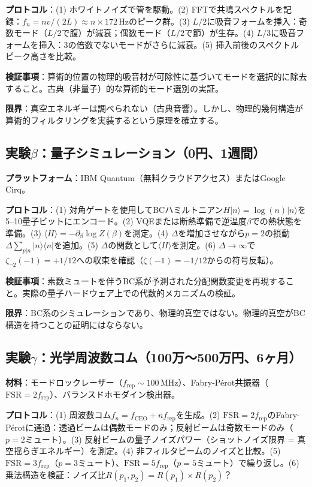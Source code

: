 \documentclass[11pt,a4paper]{article}
\begin{document}
\textbf{プロトコル}：(1) ホワイトノイズで管を駆動。(2) FFTで共鳴スペクトルを記録：$f_n = nv/(2L) \approx n \times 172$\,Hzのピーク群。(3) $L/2$に吸音フォームを挿入：奇数モード（$L/2$で腹）が減衰；偶数モード（$L/2$で節）が生存。(4) $L/3$に吸音フォームを挿入：3の倍数でないモードがさらに減衰。(5) 挿入前後のスペクトルピーク高さを比較。

\textbf{検証事項}：算術的位置の物理的吸音材が可除性に基づいてモードを選択的に除去すること。古典（非量子）的な算術的モード選別の実証。

\textbf{限界}：真空エネルギーは調べられない（古典音響）。しかし、物理的幾何構造が算術的フィルタリングを実装するという原理を確立する。

\subsection{実験$\beta$：量子シミュレーション（0円、1週間）}

\textbf{プラットフォーム}：IBM Quantum（無料クラウドアクセス）またはGoogle Cirq。

\textbf{プロトコル}：(1) 対角ゲートを使用してBCハミルトニアン$H|n\rangle = \log(n)|n\rangle$を5--10量子ビットにエンコード。(2) VQEまたは断熱準備で逆温度$\beta$での熱状態を準備。(3) $\langle H\rangle = -\partial_\beta \log Z(\beta)$を測定。(4) $\Delta$を増加させながら$p = 2$の摂動$\Delta\sum_{p|n}|n\rangle\langle n|$を追加。(5) $\Delta$の関数として$\langle H\rangle$を測定。(6) $\Delta \to \infty$で$\zeta_{\neg 2}(-1) = +1/12$への収束を確認（$\zeta(-1) = -1/12$からの符号反転）。

\textbf{検証事項}：素数ミュートを伴うBC系が予測された分配関数変更を再現すること。実際の量子ハードウェア上での代数的メカニズムの検証。

\textbf{限界}：BC系のシミュレーションであり、物理的真空ではない。物理的真空がBC構造を持つことの証明にはならない。

\subsection{実験$\gamma$：光学周波数コム（100万〜500万円、6ヶ月）}

\textbf{材料}：モードロックレーザー（$f_{\mathrm{rep}} \sim 100$\,MHz）、Fabry-P\'{e}rot共振器（$\mathrm{FSR} = 2f_{\mathrm{rep}}$）、バランスドホモダイン検出器。

\textbf{プロトコル}：(1) 周波数コム$f_n = f_{\mathrm{CEO}} + nf_{\mathrm{rep}}$を生成。(2) $\mathrm{FSR} = 2f_{\mathrm{rep}}$のFabry-P\'{e}rotに通過：透過ビームは偶数モードのみ；反射ビームは奇数モードのみ（$p = 2$ミュート）。(3) 反射ビームの量子ノイズパワー（ショットノイズ限界 = 真空揺らぎエネルギー）を測定。(4) 非フィルタビームのノイズと比較。(5) $\mathrm{FSR} = 3f_{\mathrm{rep}}$（$p = 3$ミュート）、$\mathrm{FSR} = 5f_{\mathrm{rep}}$（$p = 5$ミュート）で繰り返し。(6) 乗法構造を検証：ノイズ比$R(p_1, p_2) = R(p_1) \times R(p_2)$？
\end{document}
